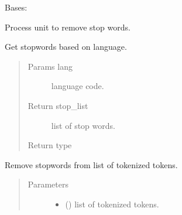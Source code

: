 \documentclass[letterpaper,10pt,english]{sphinxmanual}
\begin{document}

\begin{fulllineitems}
\label{\detokenize{matchzoo:matchzoo.preprocessors.StopRemovalUnit}}
Bases: {\hyperref[\detokenize{matchzoo:matchzoo.preprocessors.ProcessorUnit}]{}}

Process unit to remove stop words.

\begin{fulllineitems}
\label{\detokenize{matchzoo:matchzoo.preprocessors.StopRemovalUnit.get_stopwords}}
Get stopwords based on language.
\begin{quote}\begin{description}
\item[{Params lang}] \leavevmode
language code.

\item[{Return stop\_list}] \leavevmode
list of stop words.

\item[{Return type}] \leavevmode
{}

\end{description}\end{quote}

\end{fulllineitems}


\begin{fulllineitems}
\label{\detokenize{matchzoo:matchzoo.preprocessors.StopRemovalUnit.transform}}
Remove stopwords from list of tokenized tokens.
\begin{quote}\begin{description}
\item[{Parameters}] \leavevmode\begin{itemize}
\item {} 
 () \textendash{} list of tokenized tokens.


\end{itemize}
\end{description}
\end{quote}
\end{fulllineitems}
\end{fulllineitems}
\end{document}

